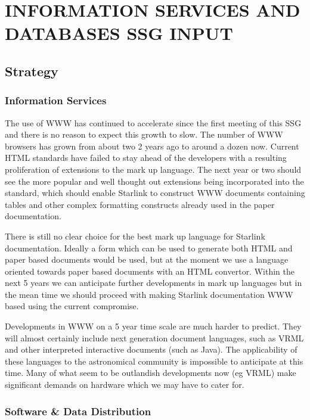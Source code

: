 \newpage
\section{INFORMATION SERVICES AND DATABASES SSG INPUT}

\subsection{Strategy}

\subsubsection{Information Services}

The use of WWW has continued to accelerate since the first meeting of
this SSG and there is no reason to expect this growth to slow. The
number of WWW browsers has grown from about two 2 years ago to around
a dozen now. Current HTML standards have failed to stay ahead of the
developers with a resulting proliferation of extensions to the mark up
language.  The next year or two should see the more popular and well
thought out extensions being incorporated into the standard, which
should enable Starlink to construct WWW documents containing tables
and other complex formatting constructs already used in the paper
documentation.

There is still no clear choice for the best mark up language for Starlink
documentation. Ideally a form which can be used to generate both HTML
and paper based documents would be used, but at the moment we use a
language oriented towards paper based documents with an HTML convertor.
Within the next 5 years we can anticipate further developments in mark
up languages but in the mean time we should proceed with making Starlink
documentation WWW based using the current compromise.

Developments in WWW on a 5 year time scale are much harder to predict.
They will almost certainly include next generation document languages,
such as VRML and other interpreted interactive documents (such as Java).
The applicability of these languages to the astronomical community is
impossible to anticipate at this time. Many of what seem to be outlandish
developments now (eg VRML) make significant demands on hardware which
we may have to cater for.

\subsubsection{Software \& Data Distribution}

